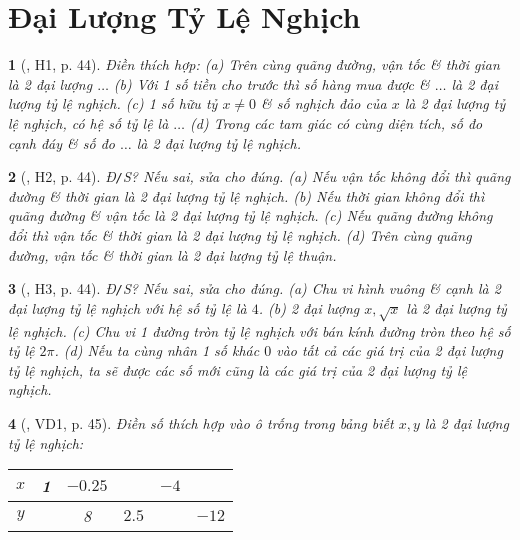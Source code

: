 \documentclass{article}
\newtheorem{baitoan}{}
\begin{document}

\section{Đại Lượng Tỷ Lệ Nghịch}

\begin{baitoan}[\cite{Binh_boi_duong_Toan_7_tap_1}, H1, p. 44]
	Điền thích hợp: (a) Trên cùng quãng đường, vận tốc \& thời gian là 2 đại lượng $\ldots$ (b) Với 1 số tiền cho trước thì số hàng mua được \& $\ldots$ là 2 đại lượng tỷ lệ nghịch. (c) 1 số hữu tỷ $x\ne0$ \& số nghịch đảo của $x$ là 2 đại lượng tỷ lệ nghịch, có hệ số tỷ lệ là $\ldots$ (d) Trong các tam giác có cùng diện tích, số đo cạnh đáy \& số đo $\ldots$ là 2 đại lượng tỷ lệ nghịch.
\end{baitoan}

\begin{baitoan}[\cite{Binh_boi_duong_Toan_7_tap_1}, H2, p. 44]
	{\rm Đ{\tt/}S?} Nếu sai, sửa cho đúng. (a) Nếu vận tốc không đổi thì quãng đường \& thời gian là 2 đại lượng tỷ lệ nghịch. (b) Nếu thời gian không đổi thì quãng đường \& vận tốc là 2 đại lượng tỷ lệ nghịch. (c) Nếu quãng đường không đổi thì vận tốc \& thời gian là 2 đại lượng tỷ lệ nghịch. (d) Trên cùng quãng đường, vận tốc \& thời gian là 2 đại lượng tỷ lệ thuận.
\end{baitoan}

\begin{baitoan}[\cite{Binh_boi_duong_Toan_7_tap_1}, H3, p. 44]
	{\rm Đ{\tt/}S?} Nếu sai, sửa cho đúng. (a) Chu vi hình vuông \& cạnh là 2 đại lượng tỷ lệ nghịch với hệ số tỷ lệ là $4$. (b) 2 đại lượng $x,\sqrt{x}$ là 2 đại lượng tỷ lệ nghịch. (c) Chu vi 1 đường tròn tỷ lệ nghịch với bán kính đường tròn theo hệ số tỷ lệ $2\pi$. (d) Nếu ta cùng nhân 1 số khác $0$ vào tất cả các giá trị của 2 đại lượng tỷ lệ nghịch, ta sẽ được các số mới cũng là các giá trị của 2 đại lượng tỷ lệ nghịch.
\end{baitoan}

\begin{baitoan}[\cite{Binh_boi_duong_Toan_7_tap_1}, VD1, p. 45]
	Điền số thích hợp vào ô trống trong bảng biết $x,y$ là 2 đại lượng tỷ lệ nghịch:
	\begin{table}[H]
		\centering
		\begin{tabular}{|c|c|c|c|c|c|}
			\hline
			$x$ & 1 & $-0.25$ &  & $-4$ &  \\
			\hline
			$y$ &  & 8 & $2.5$ &  & $-12$ \\
			\hline
		\end{tabular}
	\end{table}
\end{baitoan}
\end{document}
